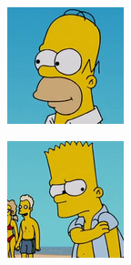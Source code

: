 \documentclass[11pt,francais]{article}
\begin{document}
\begin{figure}[!h]
    \centering
    \begin{subfigure}[b]{0.2\textwidth}
        \includegraphics[width=\textwidth]{Figures/13.png}
    \end{subfigure}
    \begin{subfigure}[b]{0.2\textwidth}
        \includegraphics[width=\textwidth]{Figures/15.png}

\end{subfigure}
\end{figure}
\end{document}
